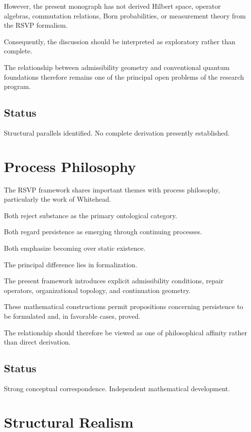 \documentclass[11pt,oneside]{book}
\numberwithin{equation}{chapter}
\theoremstyle{definition}
\theoremstyle{plain}
\begin{document}
However, the present monograph has not derived Hilbert space, operator
algebras, commutation relations, Born probabilities, or measurement theory
from the RSVP formalism.

Consequently, the discussion should be interpreted as exploratory rather
than complete.

The relationship between admissibility geometry and conventional quantum
foundations therefore remains one of the principal open problems of the
research program.

\subsection*{Status}

Structural parallels identified. No complete derivation presently
established.

\section{Process Philosophy}

The RSVP framework shares important themes with process philosophy,
particularly the work of Whitehead.

Both reject substance as the primary ontological category.

Both regard persistence as emerging through continuing processes.

Both emphasize becoming over static existence.

The principal difference lies in formalization.

The present framework introduces explicit admissibility conditions, repair
operators, organizational topology, and continuation geometry.

These mathematical constructions permit propositions concerning
persistence to be formulated and, in favorable cases, proved.

The relationship should therefore be viewed as one of philosophical
affinity rather than direct derivation.

\subsection*{Status}

Strong conceptual correspondence. Independent mathematical development.

\section{Structural Realism}
\end{document}
